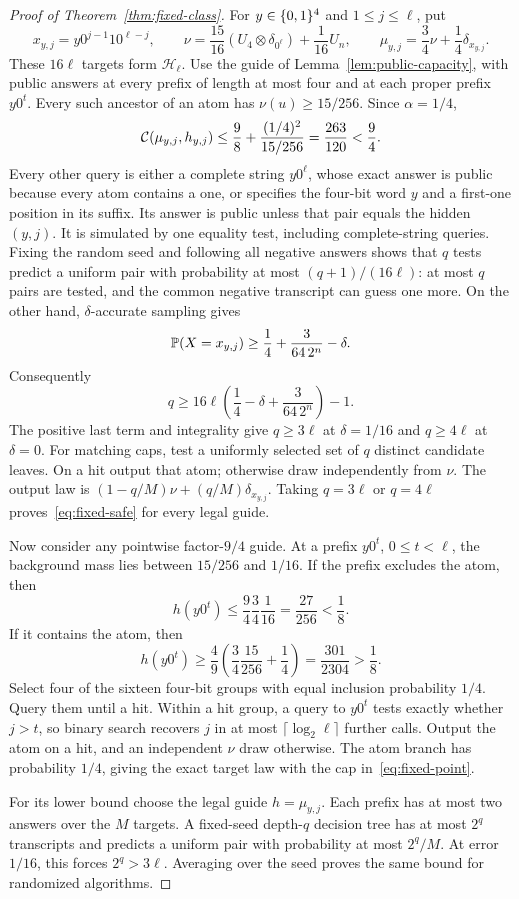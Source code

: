 \begin{proof}[Proof of Theorem~\ref{thm:fixed-class}]
For $y\in\{0,1\}^4$ and $1\le j\le\ell$, put
\[
 x_{y,j}=y0^{j-1}10^{\ell-j},\qquad
 \nu=\frac{15}{16}(U_4\otimes\delta_{0^\ell})+\frac1{16}U_n,
 \qquad \mu_{y,j}=\frac34\nu+\frac14\delta_{x_{y,j}}.
\]
These $16\ell$ targets form $\mathcal H_\ell$. Use the guide of Lemma~\ref{lem:public-capacity}, with public answers at every prefix of length at most four and at each proper prefix $y0^t$. Every such ancestor of an atom has $\nu(u)\ge15/256$. Since $\alpha=1/4$,
\[
 \mathcal C(\mu_{y,j},h_{y,j})
 \le\frac98+\frac{(1/4)^2}{15/256}
 =\frac{263}{120}<\frac94.
\]
Every other query is either a complete string $y0^\ell$, whose exact answer is public because every atom contains a one, or specifies the four-bit word $y$ and a first-one position in its suffix. Its answer is public unless that pair equals the hidden $(y,j)$. It is simulated by one equality test, including complete-string queries. Fixing the random seed and following all negative answers shows that $q$ tests predict a uniform pair with probability at most $(q+1)/(16\ell)$: at most $q$ pairs are tested, and the common negative transcript can guess one more. On the other hand, $\delta$-accurate sampling gives
\[
 \mathbb P(X=x_{y,j})\ge\frac14+\frac{3}{64\,2^n}-\delta.
\]
Consequently
\begin{equation}\label{eq:fixed-equality}
 q\ge16\ell\left(\frac14-\delta+\frac{3}{64\,2^n}\right)-1.
\end{equation}
The positive last term and integrality give $q\ge3\ell$ at $\delta=1/16$ and $q\ge4\ell$ at $\delta=0$. For matching caps, test a uniformly selected set of $q$ distinct candidate leaves. On a hit output that atom; otherwise draw independently from $\nu$. The output law is $(1-q/M)\nu+(q/M)\delta_{x_{y,j}}$. Taking $q=3\ell$ or $q=4\ell$ proves~\eqref{eq:fixed-safe} for every legal guide.

Now consider any pointwise factor-$9/4$ guide. At a prefix $y0^t$, $0\le t<\ell$, the background mass lies between $15/256$ and $1/16$. If the prefix excludes the atom, then
\[
 h(y0^t)\le\frac94\frac34\frac1{16}=\frac{27}{256}<\frac18.
\]
If it contains the atom, then
\[
 h(y0^t)\ge\frac49\left(\frac34\frac{15}{256}+\frac14\right)
 =\frac{301}{2304}>\frac18.
\]
Select four of the sixteen four-bit groups with equal inclusion probability $1/4$. Query them until a hit. Within a hit group, a query to $y0^t$ tests exactly whether $j>t$, so binary search recovers $j$ in at most $\lceil\log_2\ell\rceil$ further calls. Output the atom on a hit, and an independent $\nu$ draw otherwise. The atom branch has probability $1/4$, giving the exact target law with the cap in~\eqref{eq:fixed-point}.

For its lower bound choose the legal guide $h=\mu_{y,j}$. Each prefix has at most two answers over the $M$ targets. A fixed-seed depth-$q$ decision tree has at most $2^q$ transcripts and predicts a uniform pair with probability at most $2^q/M$. At error $1/16$, this forces $2^q>3\ell$. Averaging over the seed proves the same bound for randomized algorithms.
\end{proof}
